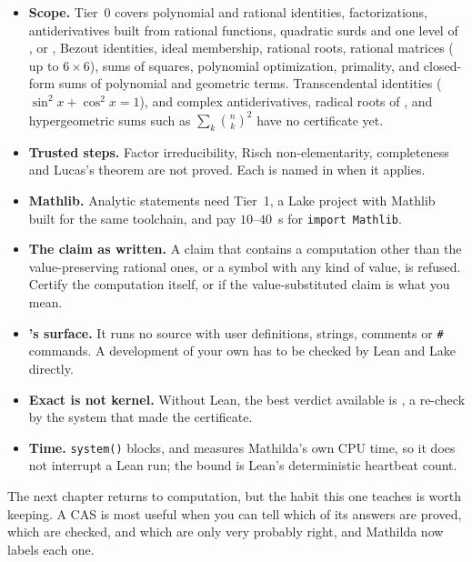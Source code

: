 \begin{itemize}
\item \textbf{Scope.} Tier~0 covers polynomial and rational identities, factorizations,
  antiderivatives built from rational functions, quadratic surds and one level of
  ,  or , Bezout identities, ideal membership, rational
  roots, rational matrices ( up to \(6\times6\)), sums of squares, polynomial
  optimization, primality, and closed-form sums of polynomial and geometric terms.
  Transcendental identities (\(\sin^2x+\cos^2x=1\)),  and complex
  antiderivatives, radical roots of , and hypergeometric sums such as
  \(\sum_k\binom nk^2\) have no certificate yet.
\item \textbf{Trusted steps.} Factor irreducibility, Risch non-elementarity,
   completeness and Lucas's theorem are not proved. Each is named in
   when it applies.
\item \textbf{Mathlib.} Analytic statements need Tier~1, a Lake project with Mathlib
  built for the same toolchain, and pay \(10\)--\(40\)~s for \texttt{import Mathlib}.
\item \textbf{The claim as written.} A claim that contains a computation other than
  the value-preserving rational ones, or a symbol with any kind of value, is refused.
  Certify the computation itself, or  if the
  value-substituted claim is what you mean.
\item \textbf{'s surface.} It runs no source with user definitions,
  strings, comments or \texttt{\#} commands. A development of your own has to be
  checked by Lean and Lake directly.
\item \textbf{Exact is not kernel.} Without Lean, the best verdict available is
  , a re-check by the system that made the
  certificate.
\item \textbf{Time.} \texttt{system()} blocks, and  measures
  Mathilda's own CPU time, so it does not interrupt a Lean run; the bound is Lean's
  deterministic heartbeat count.
\end{itemize}

The next chapter returns to computation, but the habit this one teaches is worth
keeping. A CAS is most useful when you can tell which of its answers are proved,
which are checked, and which are only very probably right, and Mathilda now labels
each one.
